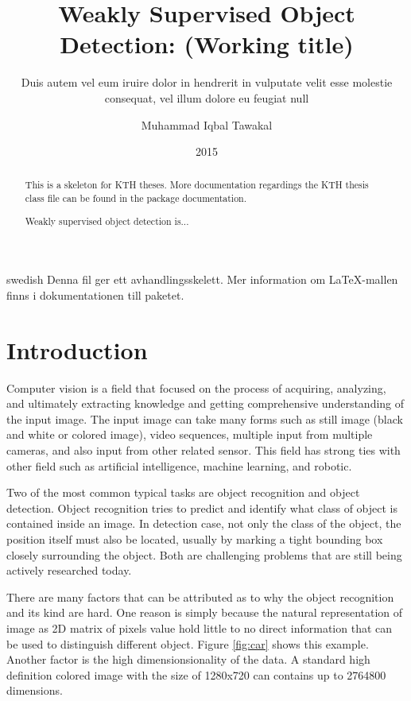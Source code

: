 \documentclass[a4paper,11pt]{kth-mag}
\title{Weakly Supervised Object Detection: (Working title)}
\subtitle{Duis autem vel eum iruire dolor in hendrerit in
          vulputate velit esse molestie consequat, vel illum
          dolore eu feugiat null}
\author{Muhammad Iqbal Tawakal}
\date{2015}
\begin{document}
\frontmatter
\pagestyle{empty}
\removepagenumbers
\maketitle
{}

\begin{abstract}
  This is a skeleton for KTH theses. More documentation
  regardings the KTH thesis class file can be found in
  the package documentation.
  
  Weakly supervised object detection is...
\end{abstract}

\clearpage
\begin{foreignabstract}{swedish}
  Denna fil ger ett avhandlingsskelett.
  Mer information om \LaTeX-mallen finns i
  dokumentationen till paketet.

\end{foreignabstract}
\clearpage
\tableofcontents*
\mainmatter
\pagestyle{newchap}


\chapter{Introduction}
\label{chap:intro}

Computer vision is a field that focused on the process of acquiring, analyzing, and ultimately extracting knowledge and getting comprehensive understanding of the input image. The input image can take many forms such as still image (black and white or colored image), video sequences, multiple input from multiple cameras, and also input from other related sensor. This field has strong ties with other field such as artificial intelligence, machine learning, and robotic.

Two of the most common typical tasks are object recognition and object detection. Object recognition tries to predict and identify what class of object is contained inside an image. In detection case, not only the class of the object, the position itself must also be located, usually by marking a tight bounding box closely surrounding the object. Both are challenging problems that are still being actively researched today.

There are many factors that can be attributed as to why the object recognition and its kind are hard. One reason is simply because the natural representation of image as 2D matrix of pixels value hold little to no direct information that can be used to distinguish different object. Figure \ref{fig:car} shows this example. Another factor is the high dimensionsionality of the data. A standard high definition colored image with the size of 1280x720 can contains up to 2764800 dimensions.
\end{document}
